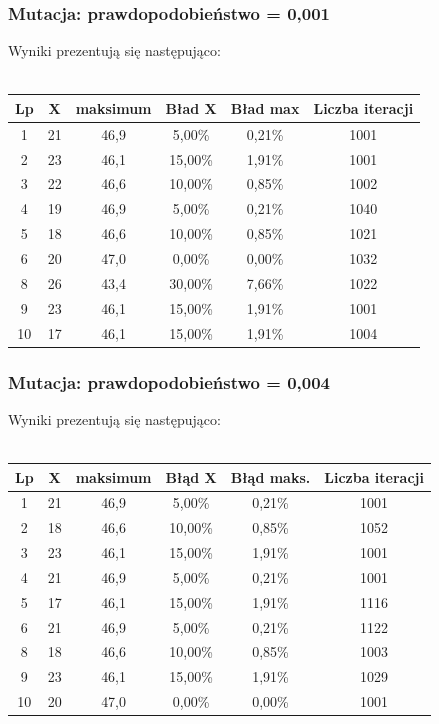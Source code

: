 \documentclass[a4paper,11pt]{article}
\begin{document}
				\subsubsection{Mutacja: prawdopodobieństwo = 0,001}
					Wyniki prezentują się następująco:\\~\\
					\begin{tabular}{|c|c|c|c|c|c|}
						\hline 
						Lp & X & maksimum & Bład X & Bład max & Liczba iteracji\\\hline
						1 & 21 & 46,9 & 5,00\% &0,21\%  &1001\\\hline
						2 & 23 & 46,1 & 15,00\% & 1,91\% &1001 \\\hline
						3 & 22 & 46,6 & 10,00\% &0,85\% &1002 \\\hline
						4 & 19 & 46,9 & 5,00\% & 0,21\%&1040 \\\hline
						5 & 18 & 46,6 & 10,00\% & 0,85\%&1021 \\\hline
						6 & 20 & 47,0 & 0,00\% & 0,00\%& 1032 \\\hline
						8 & 26 & 43,4 & 30,00\% & 7,66\%& 1022 \\\hline
						9 & 23 & 46,1 & 15,00\% & 1,91\%& 1001 \\\hline
						10 & 17 & 46,1&15,00\%  & 1,91\%& 1004 \\\hline
					\end{tabular} 
				\subsubsection{Mutacja: prawdopodobieństwo = 0,004}
					Wyniki prezentują się następująco:\\~\\
					\begin{tabular}{|c|c|c|c|c|c|}
						\hline 
						Lp & X & maksimum & Błąd X & Błąd maks. & Liczba iteracji\\
						\hline
						1 & 21 & 46,9 & 5,00\%  & 0,21\%  &1001\\\hline
						2 & 18 & 46,6 & 10,00\% & 0,85\% & 1052\\\hline
						3 & 23 & 46,1 & 15,00\% & 1,91\% &1001\\\hline
						4 & 21 & 46,9 & 5,00\%  & 0,21\% &1001\\\hline
						5 & 17 & 46,1 &  15,00\%& 1,91\% &1116\\\hline
						6 & 21  & 46,9 & 5,00\% & 0,21\% &1122\\\hline
						8 & 18 & 46,6 & 10,00\% & 0,85\% &1003\\\hline
						9 & 23 & 46,1 & 15,00\% & 1,91\% &1029\\\hline
						10 & 20 & 47,0 & 0,00\% & 0,00\% &1001\\\hline
					\end{tabular} 
\end{document}
